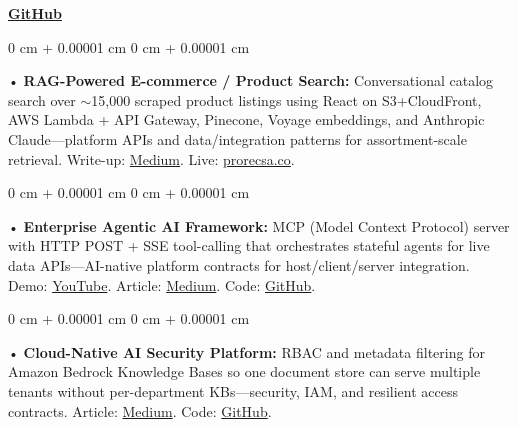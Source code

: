\documentclass[10pt, letterpaper]{article}
\newenvironment{onecolentry}{
    \begin{adjustwidth}{
        0 cm + 0.00001 cm
    }{
        0 cm + 0.00001 cm
    }
}{
    \end{adjustwidth}
} %
\begin{document}
\textbf{\href{https://github.com/daedalus-s}{GitHub}}
\begin{onecolentry}
     • \textbf{RAG-Powered E-commerce / Product Search:} Conversational catalog search over $\sim$15,000 scraped product listings using React on S3+CloudFront, AWS Lambda + API Gateway, Pinecone, Voyage embeddings, and Anthropic Claude---platform APIs and data/integration patterns for assortment-scale retrieval. Write-up: \href{https://medium.com/@sreenikethaathreya/from-rags-to-riches-bba8a671d5e6}{Medium}. Live: \href{https://prorecsa.co}{prorecsa.co}.
\end{onecolentry}
\begin{onecolentry}
     • \textbf{Enterprise Agentic AI Framework:} MCP (Model Context Protocol) server with HTTP POST + SSE tool-calling that orchestrates stateful agents for live data APIs---AI-native platform contracts for host/client/server integration. Demo: \href{https://www.youtube.com/watch?v=op2gTYyFb5U}{YouTube}. Article: \href{https://medium.com/@sreenikethaathreya/get-good-at-using-ai-noob-5d2576203112}{Medium}. Code: \href{https://github.com/daedalus-s/dota2-mcp-server}{GitHub}.
\end{onecolentry}
\begin{onecolentry}
     • \textbf{Cloud-Native AI Security Platform:} RBAC and metadata filtering for Amazon Bedrock Knowledge Bases so one document store can serve multiple tenants without per-department KBs---security, IAM, and resilient access contracts. Article: \href{https://medium.com/@sreenikethaathreya/building-a-permission-aware-genai-application-on-amazon-bedrock-8fdc2410dd43}{Medium}. Code: \href{https://github.com/daedalus-s/bedrock-acl-metadata}{GitHub}.
\end{onecolentry}
\vspace{2 pt}
        \vspace{2 pt }
\end{document}
